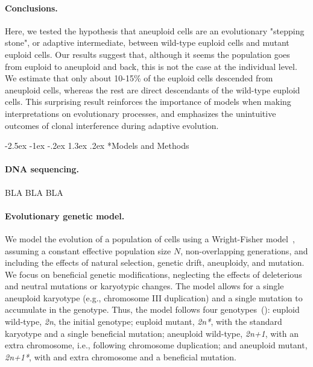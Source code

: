 \documentclass[12pt]{extarticle}
\makeatletter
\renewcommand\section{\@startsection {section}{1}{\z@}%
     {-2.5ex \@plus -1ex \@minus -.2ex}%
     {1.3ex \@plus.2ex}%
    {\Large\bfseries}}
\newcommand{\euwt}{\emph{2n}}
\newcommand{\anwt}{\emph{2n+1}}
\newcommand{\eumt}{\emph{2n*}}
\newcommand{\anmt}{\emph{2n+1*}}
\makeatother
\begin{document}
\paragraph{Conclusions.}
Here, we tested the hypothesis that aneuploid cells are an evolutionary "stepping stone", or adaptive intermediate, between wild-type euploid cells and mutant euploid cells. 
Our results suggest that, although it seems the population goes from euploid to aneuploid and back, this is not the case at the individual level. We estimate that only about 10-15\% of the euploid cells descended from aneuploid cells, whereas the rest are direct descendants of the wild-type euploid cells.
This surprising result reinforces the importance of models when making interpretations on evolutionary processes, and emphasizes the unintuitive outcomes of clonal interference during adaptive evolution.


\section*{Models and Methods}

\paragraph{DNA sequencing.}
BLA BLA BLA

\paragraph{Evolutionary genetic model.}
We model the evolution of a population of cells using a Wright-Fisher model~\citep{Otto2007}, assuming a constant effective population size $N$, non-overlapping generations, and including the effects of natural selection, genetic drift, aneuploidy, and mutation. 
We focus on beneficial genetic modifications, neglecting the effects of deleterious and neutral mutations or karyotypic changes.
The model allows for a single aneuploid karyotype (e.g., chromosome III duplication) and a single mutation to accumulate in the genotype.
Thus, the model follows four genotypes~(): euploid wild-type, \euwt, the initial genotype; 
euploid mutant, \eumt, with the standard karyotype and a single beneficial mutation; 
aneuploid wild-type, \anwt, with an extra chromosome, i.e., following chromosome duplication; and
aneuploid mutant, \anmt, with and extra chromosome and a beneficial mutation. 
\end{document}
